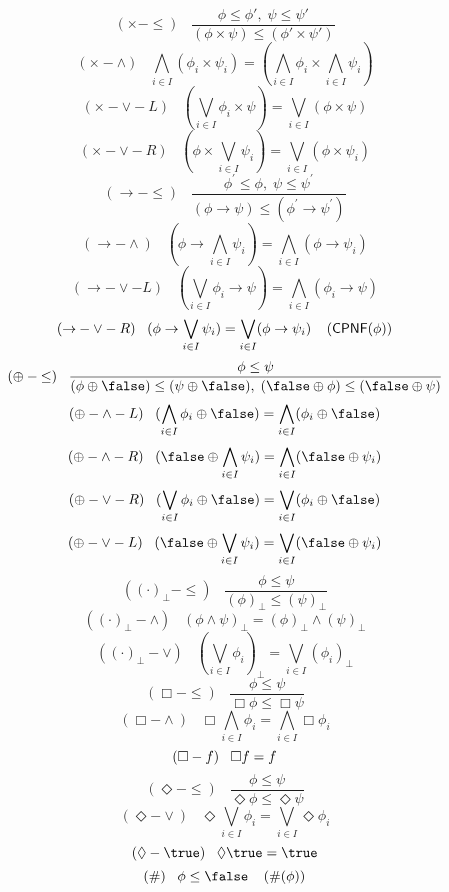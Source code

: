 \[ ({\times}-{\leq}) \;\;\; \frac{\phi \leq \phi' , \; \psi \leq \psi'}
{(\phi \times \psi ) \leq (\phi' \times \psi' )} \]
\[ ({\times}-{\wedge}) \;\;\; \bigwedge_{i \in I} (\phi_{i} \times \psi_{i}) = (\bigwedge_{i \in I} \phi_{i} \times \bigwedge_{i \in I} \psi_{i} ) \]
\[ ({\times}-{\vee}-L) \;\;\; ( \bigvee_{i \in I} \phi_{i} \times \psi ) = \bigvee_{i \in I} (\phi \times \psi ) \]
\[ ({\times}-{\vee}-R) \;\;\; (\phi \times \bigvee_{i \in I}\psi_{i}) = \bigvee_{i \in I} (\phi \times \psi_{i}) \]
\[ ({\rightarrow}-\leq ) \;\;\; \frac{\phi^{\prime} \leq \phi ,\; 
\psi \leq \psi^{\prime} }
{(\phi \rightarrow \psi )  \leq (\phi^{\prime} \rightarrow \psi^{\prime} )} \]
\[ ({\rightarrow}-\wedge ) \;\;\; 
(\phi \rightarrow \bigwedge_{i \in I} \psi_i ) = 
\bigwedge_{i \in I} (\phi \rightarrow \psi_i ) \]
\[ ({\rightarrow}-\vee-L) \;\;\; 
(\bigvee_{i \in I} \phi_{i} \rightarrow \psi ) =
\bigwedge_{i \in I} (\phi_{i} \rightarrow \psi ) \]
\[ ({\rightarrow}-\vee-R) \;\;\; 
(\phi \rightarrow \bigvee_{i \in I} \psi_{i}) =
\bigvee_{i \in I} (\phi \rightarrow \psi_{i})  \;\;\;\; ({\sf CPNF}(\phi )) \]
\[ ({\oplus}-{\leq}) \;\;\; \frac{\phi \leq \psi}{(\phi \oplus \false ) \leq (\psi \oplus \false ), \; (\false \oplus \phi ) \leq (\false \oplus \psi )} \]
\[ ({\oplus}-{\wedge}-L) \;\;\; (\bigwedge_{i \in I} \phi_{i} \oplus \false ) = 
\bigwedge_{i \in I} (\phi_{i} \oplus \false ) \]
\[ ({\oplus}-{\wedge}-R) \;\;\; (\false \oplus \bigwedge_{i \in I} \psi_{i}) =
\bigwedge_{i \in I} (\false \oplus \psi_{i}) \]
\[ ({\oplus}-{\vee}-R) \;\;\; (\bigvee_{i \in I} \phi_{i} \oplus \false ) =
\bigvee_{i \in I} (\phi_{i} \oplus \false ) \]
\[ ({\oplus}-{\vee}-L) \;\;\; (\false \oplus \bigvee_{i \in I} \psi_{i}) =
\bigvee_{i \in I} (\false \oplus \psi_{i})   \]
\[ ({( \cdot )_{\bot}}-{\leq}) \;\;\; \frac{\phi \leq \psi}{(\phi )_{\bot} \leq
(\psi )_{\bot}} \]
\[ ({( \cdot )_{\bot}}-{\wedge}) \;\;\; (\phi \wedge \psi )_{\bot} = (\phi )_{\bot} \wedge (\psi )_{\bot} \]
\[ ({( \cdot )_{\bot}}-{\vee}) \;\;\; (\bigvee_{i \in I} \phi_{i} )_{\bot} =
\bigvee_{i \in I} (\phi_{i})_{\bot} \]
\[ ({\Box}-{\leq}) \;\;\; \frac{\phi \leq \psi}{\Box \phi \leq \Box \psi} \]
\[ ({\Box}-{\wedge}) \;\;\; \Box \bigwedge_{i \in I} \phi_{i} =
\bigwedge_{i \in I} \Box \phi_{i} \]
\[ ({\Box}-{\sl f}) \;\;\; \Box {\sl f} = {\sl f} \]
\[ ({\Diamond}-{\leq}) \;\;\; \frac{\phi \leq \psi}{\Diamond \phi \leq \Diamond \psi} \]
\[ ({\Diamond}-{\vee}) \;\;\; \Diamond \bigvee_{i \in I} \phi_{i} =
\bigvee_{i \in I} \Diamond \phi_{i} \]
\[ ({\Diamond}-{\true}) \;\;\; \Diamond \true = \true \]
\[ (\#) \;\;\; \phi \leq \false \;\;\;\; (\# (\phi )) \]

